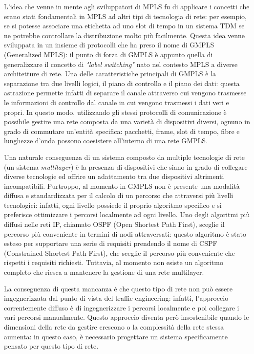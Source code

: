 \documentclass[10pt,a4paper]{report}
\begin{document}
L'idea che venne in mente agli sviluppatori di MPLS fu di applicare i
concetti che erano stati fondamentali in MPLS ad altri tipi di
tecnologia di rete: per esempio, se si potesse associare una etichetta
ad uno slot di tempo in un sistema TDM se ne potrebbe controllare la
distribuzione molto più facilmente. Questa idea venne sviluppata in un
insieme di protocolli che ha preso il nome di GMPLS (Generalized
MPLS): il punto di forza di GMPLS è appunto quella di generalizzare il
concetto di \textit{"label switching"} nato nel contesto MPLS a
diverse architetture di rete. Una delle caratteristiche principali di
GMPLS è la separazione tra due livelli logici, il piano di controllo e
il piano dei dati: questa astrazione permette infatti di separare il
canale attraverso cui vengono trasmesse le informazioni di controllo
dal canale in cui vengono trasmessi i dati veri e propri. In questo
modo, utilizzando gli stessi protocolli di comunicazione è possibile
gestire una rete composta da una varietà di dispositivi diversi,
ognuno in grado di commutare un'entità specifica: pacchetti, frame,
slot di tempo, fibre e lunghezze d'onda possono coesistere all'interno
di una rete GMPLS.

Una naturale conseguenza di un sistema composto da multiple tecnologie
di rete (un sistema \textit{multilayer}) è la presenza di dispositivi
che siano in grado di collegare diverse tecnologie ed offrire un
adattamento tra due dispositivi altrimenti incompatibili. Purtroppo,
al momento in GMPLS non è presente una modalità diffusa e
standardizzata per il calcolo di un percorso che attraversi più
livelli tecnologici: infatti, ogni livello possiede il proprio
algoritmo specifico e si preferisce ottimizzare i percorsi localmente
ad ogni livello. Uno degli algoritmi più diffusi nelle reti IP,
chiamato OSPF (Open Shortest Path First), sceglie il percorso più
conveniente in termini di nodi attraversati: questo algoritmo è stato
esteso per supportare una serie di requisiti prendendo il nome di CSPF
(Constrained Shortest Path First), che sceglie il percorso più
conveniente che rispetti i requisiti richiesti. Tuttavia, al momento
non esiste un algoritmo completo che riesca a mantenere la gestione di
una rete multilayer.

La conseguenza di questa mancanza è che questo tipo di rete non può
essere ingegnerizzata dal punto di vista del traffic engineering:
infatti, l'approccio correntemente diffuso è di ingegnerizzare i
percorsi localmente e poi collegare i vari percorsi
manualmente. Questo approccio diventa però insostenibile quando le
dimensioni della rete da gestire crescono o la complessità della rete
stessa aumenta: in questo caso, è necessario progettare un sistema
specificamente pensato per questo tipo di rete.
\end{document}

